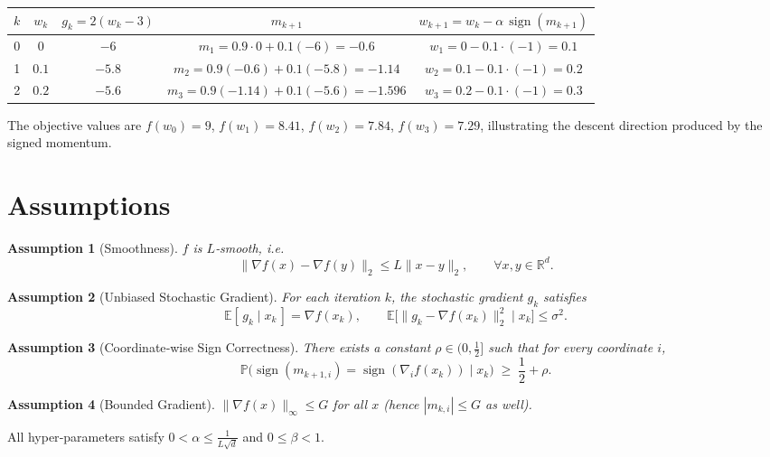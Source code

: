\documentclass{article}
\newtheorem{assumption}{Assumption}
\begin{document}
\begin{center}
\begin{tabular}{c|c|c|c|c}
$k$ & $w_k$ & $g_k=2(w_k-3)$ & $m_{k+1}$ & $w_{k+1}=w_k-\alpha\,\operatorname{sign}(m_{k+1})$ \\ \hline
0 & $0$ & $-6$ & $m_1=0.9\cdot0+0.1(-6)=-0.6$ & $w_1=0-0.1\cdot(-1)=0.1$ \\ 
1 & $0.1$ & $-5.8$ & $m_2=0.9(-0.6)+0.1(-5.8)=-1.14$ & $w_2=0.1-0.1\cdot(-1)=0.2$ \\ 
2 & $0.2$ & $-5.6$ & $m_3=0.9(-1.14)+0.1(-5.6)=-1.596$ & $w_3=0.2-0.1\cdot(-1)=0.3$
\end{tabular}
\end{center}
The objective values are $f(w_0)=9$, $f(w_1)=8.41$, $f(w_2)=7.84$, $f(w_3)=7.29$, illustrating the descent direction produced by the signed momentum.

\newpage
\section*{Assumptions}
\begin{assumption}[Smoothness]\label{asm:smooth}
$f$ is $L$‑smooth, i.e.
\[
\|\nabla f(x)-\nabla f(y)\|_2 \le L\|x-y\|_2,\qquad \forall x,y\in\mathbb{R}^d .
\]
\end{assumption}

\begin{assumption}[Unbiased Stochastic Gradient]\label{asm:unbiased}
For each iteration $k$, the stochastic gradient $g_k$ satisfies
\[
\mathbb{E}[\,g_k\mid x_k\,]=\nabla f(x_k),\qquad 
\mathbb{E}\big[\|g_k-\nabla f(x_k)\|_2^2\mid x_k\big]\le \sigma^2 .
\]
\end{assumption}

\begin{assumption}[Coordinate‑wise Sign Correctness]\label{asm:sign}
There exists a constant $\rho\in(0,\tfrac12]$ such that for every coordinate $i$,
\[
\mathbb{P}\!\big(\operatorname{sign}(m_{k+1,i})=\operatorname{sign}(\nabla_i f(x_k))\mid x_k\big)
\;\ge\; \frac12+\rho .
\]
\end{assumption}

\begin{assumption}[Bounded Gradient]\label{asm:bound}
$\|\nabla f(x)\|_\infty \le G$ for all $x$ (hence $|m_{k,i}|\le G$ as well).
\end{assumption}

All hyper‑parameters satisfy $0<\alpha\le \frac{1}{L\sqrt{d}}$ and $0\le\beta<1$.
\end{document}
